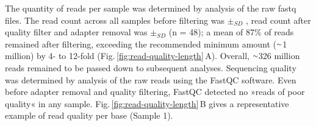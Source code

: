 \begin{method}
The quantity of reads per sample was determined by analysis of the raw fastq files. The read count across all samples before filtering was  $\pm_{SD}$ , read count after quality filter and adapter removal was  $\pm_{SD}$  (n = 48); a mean of 87\% of reads remained after filtering, exceeding the recommended minimum amount ($\smallsim$\num{1} million) by 4- to 12-fold (Fig.\,\ref{fig:read-quality-length}\,A). Overall, $\smallsim$326 million reads remained to be passed down to subsequent analyses. Sequencing quality was determined by analysis of the raw reads using the FastQC software.\cite{Andrews2012} Even before adapter removal and quality filtering, FastQC detected no »reads of poor quality« in any sample. Fig.\,\ref{fig:read-quality-length}\,B gives a representative example of read quality per base (Sample \num{1}).

\end{method}

